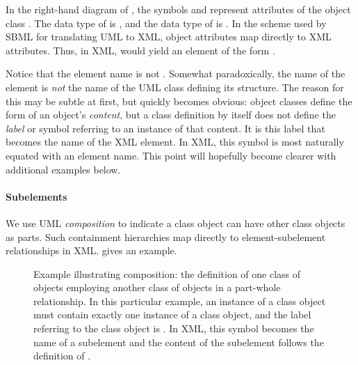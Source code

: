 In the right-hand diagram of , the
symbols  and  represent
attributes of the object class .  The data
type of  is , and the data type of
 is .  In the scheme used
by SBML for translating UML to XML, object attributes map directly
to XML attributes.  Thus, in XML,  would yield
an element of the form .

Notice that the element name is not .
Somewhat paradoxically, the name of the element is \emph{not} the
name of the UML class defining its structure.  The reason for this
may be subtle at first, but quickly becomes obvious: object
classes define the form of an object's \emph{content}, but a class
definition by itself does not define the \emph{label} or symbol
referring to an instance of that content.  It is this label that
becomes the name of the XML element.  In XML, this symbol is most
naturally equated with an element name.  This point will hopefully
become clearer with additional examples below.


\paragraph{Subelements}

We use UML \emph{composition} to indicate a class object can
have other class objects as parts.  Such containment hierarchies
map directly to element-subelement relationships in XML.
 gives an example.

\begin{figure}[htb]
  \centering
  \small
  \caption{Example illustrating composition: the definition of one
    class of objects employing another class of objects in a
    part-whole relationship.  In this particular example, an
    instance of a  class object must contain exactly
    one instance of a  class object, and the label
    referring to the  class object is .
    In XML, this symbol becomes the name of a subelement and the
    content of the subelement follows the definition of
    .}
  \label{fig:subelement-eg}
\end{figure}

